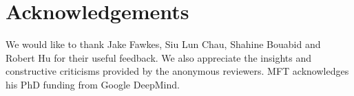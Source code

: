 \section*{Acknowledgements}
We would like to thank Jake Fawkes, Siu Lun Chau, Shahine Bouabid and Robert Hu for their useful feedback. 
We also appreciate the insights and constructive criticisms provided by the anonymous reviewers.
MFT acknowledges his PhD funding from Google DeepMind.
